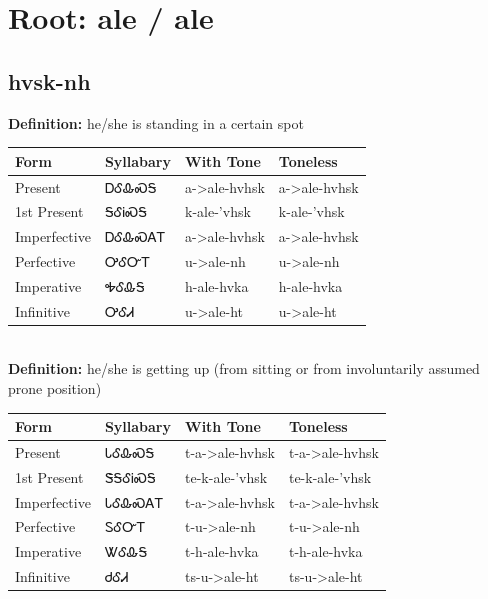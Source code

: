 \documentclass{article}%
\begin{document}
%
\normalsize%
\section*{Root: ale / ale}%
\subsection*{hvsk-nh}%
\textbf{Definition: }%
he/she is standing in a certain spot%
\\[0.5em]%
\begin{tabular}{|l|l|l|l|}%
\hline%
\textbf{Form}&\textbf{Syllabary}&\textbf{With Tone}&\textbf{Toneless}\\%
\hline%
Present&ᎠᎴᎲᏍᎦ&a{-}>ale{-}hvhsk&a{-}>ale{-}hvhsk\\%
1st Present&ᎦᎴᎥᏍᎦ&k{-}ale{-}'vhsk&k{-}ale{-}'vhsk\\%
Imperfective&ᎠᎴᎲᏍᎪᎢ&a{-}>ale{-}hvhsk&a{-}>ale{-}hvhsk\\%
Perfective&ᎤᎴᏅᎢ&u{-}>ale{-}nh&u{-}>ale{-}nh\\%
Imperative&ᎭᎴᎲᎦ&h{-}ale{-}hvka&h{-}ale{-}hvka\\%
Infinitive&ᎤᎴᏗ&u{-}>ale{-}ht&u{-}>ale{-}ht\\%
\hline%
\end{tabular}%
\\[1em]%
\textbf{Definition: }%
he/she is getting up (from sitting or from involuntarily assumed prone position)%
\\[0.5em]%
\begin{tabular}{|l|l|l|l|}%
\hline%
\textbf{Form}&\textbf{Syllabary}&\textbf{With Tone}&\textbf{Toneless}\\%
\hline%
Present&ᏓᎴᎲᏍᎦ&t{-}a{-}>ale{-}hvhsk&t{-}a{-}>ale{-}hvhsk\\%
1st Present&ᏕᎦᎴᎥᏍᎦ&te{-}k{-}ale{-}'vhsk&te{-}k{-}ale{-}'vhsk\\%
Imperfective&ᏓᎴᎲᏍᎪᎢ&t{-}a{-}>ale{-}hvhsk&t{-}a{-}>ale{-}hvhsk\\%
Perfective&ᏚᎴᏅᎢ&t{-}u{-}>ale{-}nh&t{-}u{-}>ale{-}nh\\%
Imperative&ᏔᎴᎲᎦ&t{-}h{-}ale{-}hvka&t{-}h{-}ale{-}hvka\\%
Infinitive&ᏧᎴᏗ&ts{-}u{-}>ale{-}ht&ts{-}u{-}>ale{-}ht\\%
\hline%
\end{tabular}%
\\[1em]%
\end{document}
